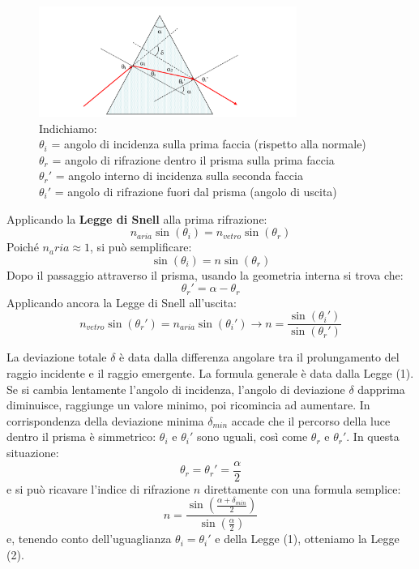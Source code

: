 \begin{figure}[H]
	\centering
	\includegraphics[width=0.75\textwidth]{./figures/prismateoria}
	\caption{Indichiamo: \\
		$\theta_i$ = angolo di incidenza sulla prima faccia (rispetto alla normale) \\
		$\theta_r$ = angolo di rifrazione dentro il prisma sulla prima faccia \\
		$\theta_r'$ = angolo interno di incidenza sulla seconda faccia \\
		$\theta_i'$ = angolo di rifrazione fuori dal prisma (angolo di uscita)}
\end{figure}

Applicando la \textbf{Legge di Snell} alla prima rifrazione:
\begin{equation}
	n_{aria}\sin(\theta_i)=n_{vetro}\sin(\theta_r)
\end{equation}
Poiché $n_aria \approx 1$, si può semplificare:
\begin{equation}
	\sin(\theta_i)=n\sin(\theta_r)
\end{equation}
Dopo il passaggio attraverso il prisma, usando la geometria interna si trova che:
\begin{equation}
	\theta_r'=\alpha-\theta_r
\end{equation}
Applicando ancora la Legge di Snell all'uscita:
\begin{equation}
	n_{vetro}\sin(\theta_r')=n_{aria}\sin(\theta_i') \rightarrow n=\frac{\sin(\theta_i')}{\sin(\theta_r')}
\end{equation}

La deviazione totale $\delta$ è data dalla differenza angolare tra il prolungamento del raggio incidente e il raggio emergente. La formula generale è data dalla Legge (1). Se si cambia lentamente l'angolo di incidenza, l'angolo di deviazione $\delta$ dapprima diminuisce, raggiunge un valore minimo, poi ricomincia ad aumentare. In corrispondenza della deviazione minima $\delta_{min}$ accade che il percorso della luce dentro il prisma è simmetrico: $\theta_i$ e $\theta_i'$ sono uguali, così come $\theta_r$ e $\theta_r'$. In questa situazione:
\begin{equation}
	\theta_r = \theta_r'=\frac{\alpha}{2}
\end{equation}
e si può ricavare l'indice di rifrazione $n$ direttamente con una formula semplice:
\begin{equation}
	n=\frac{\sin\left(\frac{\alpha+\delta_{min}}{2}\right)}{\sin\left(\frac{\alpha}{2}\right)}
\end{equation}
e, tenendo conto dell'uguaglianza $\theta_i=\theta_i'$ e della Legge (1), otteniamo la Legge (2).


